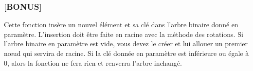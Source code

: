 \medskip


\subsubsection*{\textbf{[BONUS] }}

\noindent Cette fonction insère un nouvel élément et sa clé dans l'arbre binaire donné en paramètre.
L'insertion doit être faite en racine avec la méthode des rotations.
Si l'arbre binaire en paramètre est vide, vous devez le créer et lui allouer un premier nœud qui servira de racine.
Si la clé donnée en paramètre est inférieure ou égale à $ 0 $, alors la fonction ne fera rien et renverra l'arbre inchangé.
